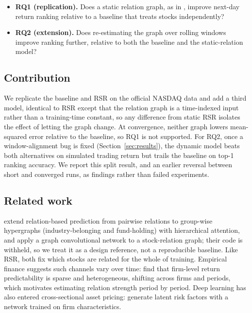 \documentclass[12pt]{article}
\begin{document}
\begin{itemize}
  \item \textbf{RQ1 (replication).} Does a static relation graph, as in \citet{feng2019temporal},
  improve next-day return ranking relative to a baseline that treats stocks independently?
  \item \textbf{RQ2 (extension).} Does re-estimating the graph over rolling windows improve
  ranking further, relative to both the baseline and the static-relation model?
\end{itemize}

\subsection{Contribution}

We replicate the baseline and RSR on the official NASDAQ data and add a third model, identical to
RSR except that the relation graph is a time-indexed input rather than a training-time constant,
so any difference from static RSR isolates the effect of letting the graph change. At convergence,
neither graph lowers mean-squared error relative to the baseline, so RQ1 is not supported. For
RQ2, once a window-alignment bug is fixed (Section~\ref{sec:results}), the dynamic model beats
both alternatives on simulated trading return but trails the baseline on top-1 ranking accuracy.
We report this split result, and an earlier reversal between short and converged runs, as
findings rather than failed experiments.

\subsection{Related work}
\label{sec:related}

\citet{cui2023temporal} extend relation-based prediction from pairwise relations to group-wise
hypergraphs (industry-belonging and fund-holding) with hierarchical attention, and
\citet{jafari2022gcnet} apply a graph convolutional network to a stock-relation graph; their code
is withheld, so we treat it as a design reference, not a reproducible baseline. Like RSR, both
fix which stocks are related for the whole of training. Empirical finance suggests such channels
vary over time: \citet{evgeniou2023uncovering} find that firm-level return predictability is
sparse and heterogeneous, shifting across firms and periods, which motivates estimating relation
strength period by period. Deep learning has also entered cross-sectional asset pricing:
\citet{feng2024deep} generate latent risk factors with a network trained on firm characteristics.
\end{document}
